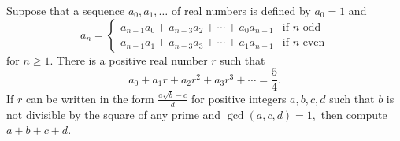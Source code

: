 Suppose that a sequence $a_0, a_1, \ldots$ of real numbers is defined by $a_0=1$ and \[a_n=\begin{cases}a_{n-1}a_0+a_{n-3}a_2+\cdots+a_0a_{n-1} & \text{if }n\text{ odd}\\a_{n-1}a_1+a_{n-3}a_3+\cdots+a_1a_{n-1} & \text{if }n\text{ even}\end{cases}\] for $n\geq1$. There is a positive real number $r$ such that \[a_0+a_1r+a_2r^2+a_3r^3+\cdots=\frac{5}{4}.\] If $r$ can be written in the form $\frac{a\sqrt{b}-c}{d}$ for positive integers $a,b,c,d$ such that $b$ is not divisible by the square of any prime and $\gcd (a,c,d)=1,$ then compute $a+b+c+d$.
